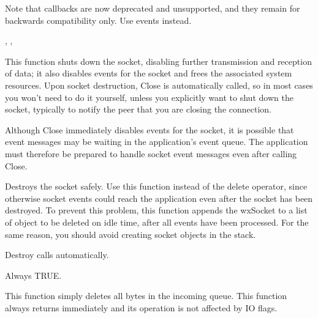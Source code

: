 
Note that callbacks are now deprecated and unsupported, and they remain
for backwards compatibility only. Use events instead.


, 
, 

%
%
\label{wxsocketbaseclose}


This function shuts down the socket, disabling further transmission and
reception of data; it also disables events for the socket and frees the
associated system resources. Upon socket destruction, Close is automatically
called, so in most cases you won't need to do it yourself, unless you
explicitly want to shut down the socket, typically to notify the peer
that you are closing the connection.


Although Close immediately disables events for the socket, it is possible
that event messages may be waiting in the application's event queue. The
application must therefore be prepared to handle socket event messages
even after calling Close.

%
%
\label{wxsocketbasedestroy}


Destroys the socket safely. Use this function instead of the delete operator,
since otherwise socket events could reach the application even after the
socket has been destroyed. To prevent this problem, this function appends
the wxSocket to a list of object to be deleted on idle time, after all
events have been processed. For the same reason, you should avoid creating
socket objects in the stack.

Destroy calls  automatically.


Always TRUE.

%
%
\label{wxsocketbasediscard}


This function simply deletes all bytes in the incoming queue. This function
always returns immediately and its operation is not affected by IO flags.

